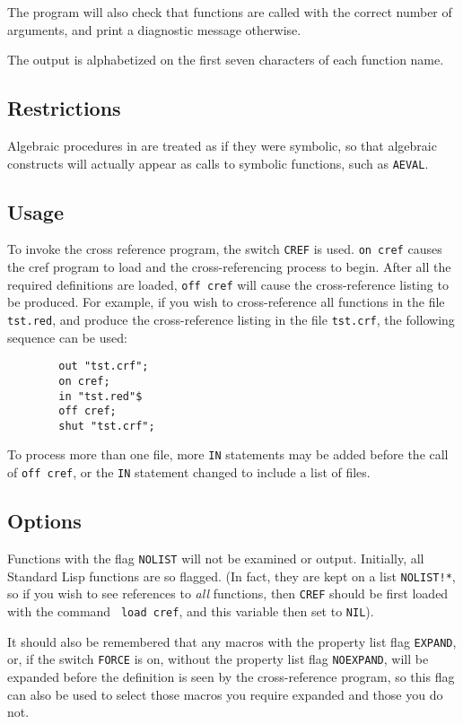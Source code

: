 The program will also check that functions are called with the correct
number of arguments, and print a diagnostic message otherwise.

The output is alphabetized on the first seven characters of each function
name.

\subsection{Restrictions}

Algebraic procedures in {\REDUCE} are treated as if they were symbolic, so
that algebraic constructs will actually appear as calls to symbolic
functions, such as {\tt AEVAL}.

\subsection{Usage}

To invoke the cross reference program, the switch {\tt CREF}
 is used. {\tt on cref} causes the cref program to load
and the cross-referencing process to begin.  After all the required
definitions are loaded, {\tt off cref} will cause the cross-reference
listing to be produced.  For example, if you wish to cross-reference all
functions in the file {\tt tst.red}, and produce the cross-reference
listing in the file {\tt tst.crf}, the following sequence can be used:
\begin{verbatim}
        out "tst.crf";
        on cref;
        in "tst.red"$
        off cref;
        shut "tst.crf";
\end{verbatim}
To process more than one file, more {\tt IN} statements may be added
before the call of {\tt off cref}, or the {\tt IN} statement changed to
include a list of files.

\subsection{Options}

Functions with the flag {\tt NOLIST} will not be examined or output.
Initially, all Standard Lisp functions are so flagged. (In fact, they are
kept on a list {\tt NOLIST!*}, so if you wish to see references to {\em
all} functions, then {\tt CREF} should be first loaded with the command {\tt
load cref}, and this variable then set to {\tt NIL}).

It should also be remembered that any macros with the property list flag
{\tt EXPAND}, or, if the switch {\tt FORCE} is on, without the property
list flag {\tt NOEXPAND}, will be expanded before the definition is seen
by the cross-reference program, so this flag can also be used to select
those macros you require expanded and those you do not.

